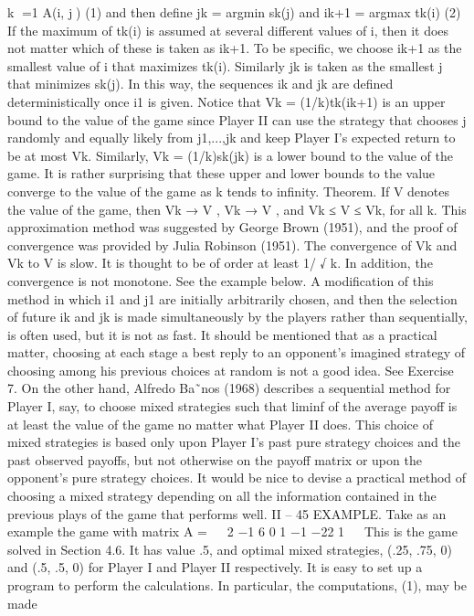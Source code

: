\documentclass[]{report}
\begin{document}
k
=1
A(i, j) (1)
and then define
jk = argmin sk(j) and ik+1 = argmax tk(i) (2)
If the maximum of tk(i) is assumed at several different values of i, then it does not matter
which of these is taken as ik+1. To be specific, we choose ik+1 as the smallest value of i
that maximizes tk(i). Similarly jk is taken as the smallest j that minimizes sk(j). In this
way, the sequences ik and jk are defined deterministically once i1 is given.
Notice that Vk = (1/k)tk(ik+1) is an upper bound to the value of the game since
Player II can use the strategy that chooses j randomly and equally likely from j1,...,jk
and keep Player I’s expected return to be at most Vk. Similarly, Vk = (1/k)sk(jk) is a
lower bound to the value of the game. It is rather surprising that these upper and lower
bounds to the value converge to the value of the game as k tends to infinity.
Theorem. If V denotes the value of the game, then Vk → V , Vk → V , and Vk ≤ V ≤ Vk,
for all k.
This approximation method was suggested by George Brown (1951), and the proof
of convergence was provided by Julia Robinson (1951). The convergence of Vk and Vk to
V is slow. It is thought to be of order at least 1/
√
k. In addition, the convergence is not
monotone. See the example below.
A modification of this method in which i1 and j1 are initially arbitrarily chosen, and
then the selection of future ik and jk is made simultaneously by the players rather than
sequentially, is often used, but it is not as fast.
It should be mentioned that as a practical matter, choosing at each stage a best reply
to an opponent’s imagined strategy of choosing among his previous choices at random is
not a good idea. See Exercise 7. On the other hand, Alfredo Ba˜nos (1968) describes a
sequential method for Player I, say, to choose mixed strategies such that liminf of the
average payoff is at least the value of the game no matter what Player II does. This
choice of mixed strategies is based only upon Player I’s past pure strategy choices and
the past observed payoffs, but not otherwise on the payoff matrix or upon the opponent’s
pure strategy choices. It would be nice to devise a practical method of choosing a mixed
strategy depending on all the information contained in the previous plays of the game that
performs well.
II – 45
EXAMPLE. Take as an example the game with matrix
A =
⎛
⎝
2 −1 6
0 1 −1
−22 1
⎞
⎠
This is the game solved in Section 4.6. It has value .5, and optimal mixed strategies,
(.25, .75, 0) and (.5, .5, 0) for Player I and Player II respectively. It is easy to set up a
program to perform the calculations. In particular, the computations, (1), may be made
\end{document}
